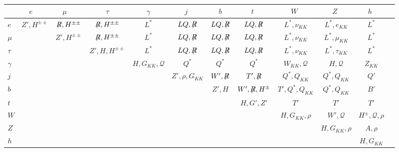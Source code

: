 \begin{table}[!htb]
\caption{}
\label{tab:restheory}
\begin{adjustbox}{width=1\textwidth}
\begin{tabular}{lccccccccccc}
\hline
\hline
 & $e$\ \   & $\mu$\ \   & \ \  $\tau$\ \   & \ \  $\gamma$\ \   & \ \  $j$ \ \   & \ \  $b$\ \  & \ \ $t$ \ \ & \ \ $W$ \ \ & \ \ $Z$ \ \ & \ \ $h$ \ \   \\
\hline
$e$ &  $Z',H^{\pm\pm} $ & $\not \! \! R,H^{\pm\pm} $ & $\not \! \! R,H^{\pm\pm} $ & $L^*$  & $LQ,\not \!\! R$ & $LQ, \not \!\! R$ & $LQ,\not \!\! R$ & $L^*, \nu_{KK}$ & $L^*, e_{KK}$ & $L^*$ \\
$ \mu $ &  & $Z',H^{\pm\pm}$ & $\not \! \! R,H^{\pm\pm} $ & $L^*$  & $LQ,\not \!\! R$ & $LQ, \not \!\! R$ & $LQ,\not \!\! R$ & $L^*, \nu_{KK}$ & $L^*, \mu_{KK}$ & $L^*$ \\
$\tau$ &  &  & $Z',H,H^{\pm\pm}$ & $L^*$ & $LQ, \not \!\! R$ & $LQ,\not \!\! R$ & $LQ,\not \!\! R$ & $L^*, \nu_{KK}$ & $L^*, \tau_{KK}$ & $L^*$ \\
$\gamma$ &  & & & $H, G_{KK}, \mathcal{Q}$ & $Q^*$ & $Q^*$ & $Q^*$ & $W_{KK}, \mathcal{Q}$ & $H, \mathcal{Q}$ & $Z_{KK}$\\
$j$ &  &  &  &  & $Z',\rho, G_{KK}$ & $W',\not \!\! R$ & $T', \not \!\! R$ & $Q^*, Q_{KK}$  & $Q^*, Q_{KK}$  & $Q'$\\
$b$  &  &  &  &  &  & $Z',H$ & $W', \not \!\! R, H^\pm$ &  $T',Q^*, Q_{KK}$  & $Q^*, Q_{KK}$  & $B'$\\
$t$ &  &  &  &  &  &   & $H,G',Z'$ & $T'$ & $T'$  & $T'$\\
$W$ &  &  &  &  &  &  &  & $H, G_{KK}, \rho$ & $W', \mathcal{Q}$ & $H^\pm, \mathcal{Q}, \rho$ \\
$Z$ &  &  &  &  &  &  &  &  & $H, G_{KK}, \rho$ & $A, \rho$   \\
$h$ &  &  &  &  &  &  &  &  &  & $H, G_{KK}$ \\

\hline
\hline
\end{tabular}
\end{adjustbox}
\end{table}



